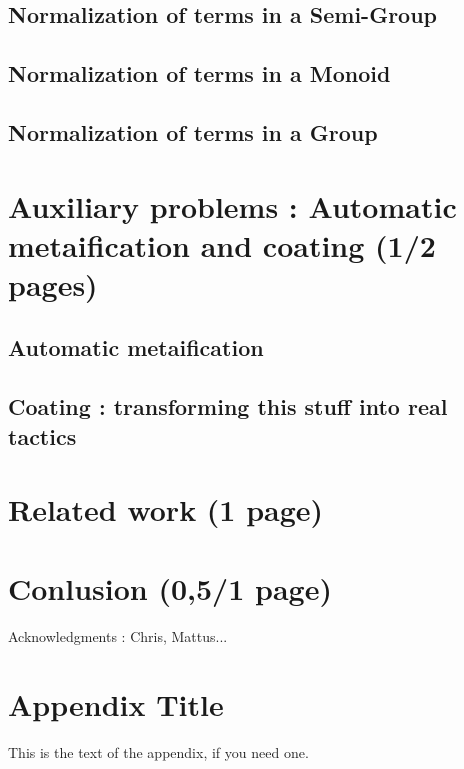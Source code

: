 \documentclass{sigplanconf}
\begin{document}
	\subsection {Normalization of terms in a Semi-Group}

	\subsection {Normalization of terms in a Monoid}

	\subsection {Normalization of terms in a Group}

\section {Auxiliary problems : Automatic metaification and coating (1/2 pages)}

	\subsection {Automatic metaification}

	\subsection {Coating : transforming this stuff into real tactics}

\section {Related work (1 page)}

\section {Conlusion (0,5/1 page)}


\acks

Acknowledgments : Chris, Mattus...





\appendix
\section{Appendix Title}

This is the text of the appendix, if you need one.
\end{document}
